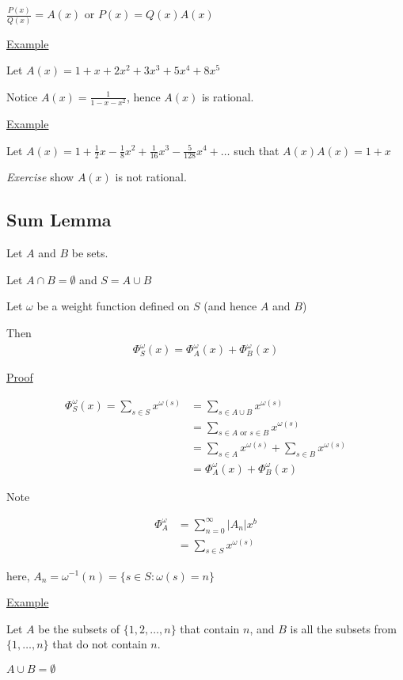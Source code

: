 \documentclass{article}
\begin{document}
$\frac{P(x)}{Q(x)} = A(x)$ or $P(x) = Q(x)A(x)$

\underline{Example}

Let $A(x) = 1+x+2x^2+3x^3+5x^4+8x^5$

Notice $A(x) = \frac{1}{1-x-x^2}$, hence $A(x)$ is rational. 

\underline{Example}

Let $A(x) = 1+\frac{1}{2}x-\frac{1}{8}x^2+\frac{1}{16}x^3-\frac{5}{128}x^4+\ldots$ such that $A(x)A(x) = 1+x$

\textit{Exercise} show $A(x)$ is not rational.

\subsection{Sum Lemma}

Let $A$ and $B$ be sets.

Let $A \cap B = \emptyset$ and $S=A\cup B$

Let $\omega$ be a weight function defined on $S$ (and hence $A$ and $B$)

Then
\begin{align*}
\Phi_S^{\omega}(x) = \Phi_A^{\omega}(x) + \Phi_B^{\omega}(x)
\end{align*}

\underline{Proof}

\begin{align*}
    \Phi_S^{\omega}(x) = \sum_{s \in S}x^{\omega(s)} &= \sum_{s\in A \cup B}x^{\omega(s)} \\
    &= \sum_{s \in A \text{ or } s \in B}x^{\omega(s)} \\
    &= \sum_{s \in A}x^{\omega(s)} + \sum_{s \in B}x^{\omega(s)} \\
    &= \Phi_A^{\omega}(x) + \Phi_{B}^{\omega}(x)
\end{align*}

Note 

\begin{align*}
\Phi_A^{\omega} &= \sum_{n=0}^{\infty}|A_n|x^b \\
&= \sum_{s \in S}x^{\omega(s)}
\end{align*}

here, $A_n = \omega^{-1}(n) = \{s \in S: \omega(s)=n\}$

\underline{Example}

Let $A$ be the subsets of $\{1,2,\ldots,n\}$ that contain $n$, and $B$ is all the subsets from $\{1,\ldots,n\}$ that do not contain $n$. 

$A \cup B = \emptyset$
\end{document}
